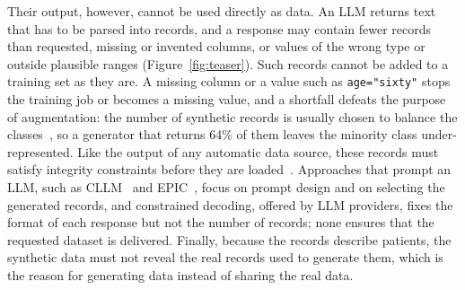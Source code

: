 \documentclass[conference]{IEEEtran}
\begin{document}
Their output, however, cannot be used directly as data. An LLM returns text that has to be parsed into records, and a response may contain fewer records than requested, missing or invented columns, or values of the wrong type or outside plausible ranges (Figure~\ref{fig:teaser}). Such records cannot be added to a training set as they are. A missing column or a value such as \texttt{age="sixty"} stops the training job or becomes a missing value, and a shortfall defeats the purpose of augmentation: the number of synthetic records is usually chosen to balance the classes~\cite{chawla2002smote}, so a generator that returns 64\% of them leaves the minority class under-represented. Like the output of any automatic data source, these records must satisfy integrity constraints before they are loaded~\cite{ge2021kamino,rorseth2026recovering,schelter2018deequ,breck2019datavalidation}. Approaches that prompt an LLM, such as CLLM~\cite{seedat2024cllm} and EPIC~\cite{kim2024epic}, focus on prompt design and on selecting the generated records, and constrained decoding, offered by LLM providers, fixes the format of each response but not the number of records; none ensures that the requested dataset is delivered. Finally, because the records describe patients, the synthetic data must not reveal the real records used to generate them, which is the reason for generating data instead of sharing the real data.
\end{document}
